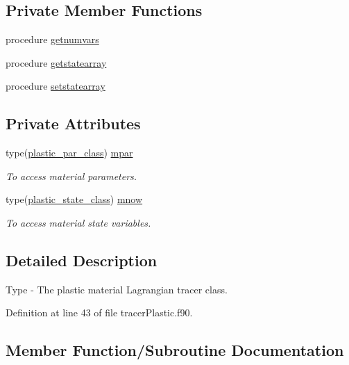 \subsection*{Private Member Functions}
\begin{DoxyCompactItemize}
\item 
procedure \mbox{\hyperlink{structtracerplastic__mod_1_1plastic__class_a86eb9828ca9f40789da553d1d40fae19}{getnumvars}}
\item 
procedure \mbox{\hyperlink{structtracerplastic__mod_1_1plastic__class_a633bfd965f7964ca5d8fd9fdb7c3e2d0}{getstatearray}}
\item 
procedure \mbox{\hyperlink{structtracerplastic__mod_1_1plastic__class_ae42b613c9b924bc54f278c1361ca59e3}{setstatearray}}
\end{DoxyCompactItemize}
\subsection*{Private Attributes}
\begin{DoxyCompactItemize}
\item 
type(\mbox{\hyperlink{structtracerplastic__mod_1_1plastic__par__class}{plastic\+\_\+par\+\_\+class}}) \mbox{\hyperlink{structtracerplastic__mod_1_1plastic__class_aa7e8b3a74a085714eac5917aaa2fc8c6}{mpar}}
\begin{DoxyCompactList}\small\item\em To access material parameters. \end{DoxyCompactList}\item 
type(\mbox{\hyperlink{structtracerplastic__mod_1_1plastic__state__class}{plastic\+\_\+state\+\_\+class}}) \mbox{\hyperlink{structtracerplastic__mod_1_1plastic__class_aa2e33df26e814fa1380e8184c54ee42e}{mnow}}
\begin{DoxyCompactList}\small\item\em To access material state variables. \end{DoxyCompactList}\end{DoxyCompactItemize}


\subsection{Detailed Description}
Type -\/ The plastic material Lagrangian tracer class. 

Definition at line 43 of file tracer\+Plastic.\+f90.



\subsection{Member Function/\+Subroutine Documentation}
\mbox{\label{structtracerplastic__mod_1_1plastic__class_a86eb9828ca9f40789da553d1d40fae19}} 
